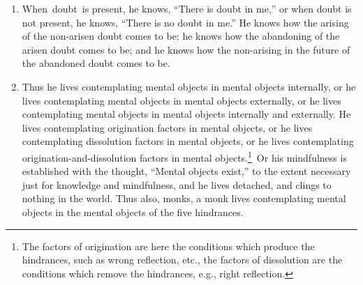\documentclass[a4 paper, 12pt]{article}
\begin{document}
\begin{multicols}{2}
\begin{enumerate}[resume]
\item When doubt is present, he knows, “There is doubt in me,” or when doubt is not present, he knows, “There is no doubt in me.” He knows how the arising of the non-arisen doubt comes to be; he knows how the abandoning of the arisen doubt comes to be; and he knows how the non-arising in the future of the abandoned doubt comes to be.
\item Thus he lives contemplating mental objects in mental objects internally, or he lives contemplating mental objects in mental objects externally, or he lives contemplating mental objects in mental objects internally and externally. He lives contemplating origination factors in mental objects, or he lives contemplating dissolution factors in mental objects, or he lives contemplating origination-and-dissolution factors in mental objects.\footnote{The factors of origination are here the conditions which produce the hindrances, such as wrong reflection, etc., the factors of dissolution are the conditions which remove the hindrances, e.g., right reflection.} Or his mindfulness is established with the thought, “Mental objects exist,” to the extent necessary just for knowledge and mindfulness, and he lives detached, and clings to nothing in the world. Thus also, monks, a monk lives contemplating mental objects in the mental objects of the five hindrances.
\end{enumerate}

\end{multicols}
\end{document}
